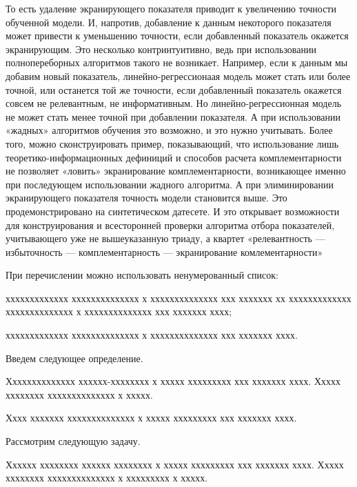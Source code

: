\documentclass[12pt]{a&t}
\begin{document}
То есть удаление экранирующего показателя приводит к увеличению точности обученной модели. И, напротив, добавление к данным некоторого показателя может привести к уменьшению точности, если добавленный показатель окажется экранирующим. Это несколько контринтуитивно, ведь при использовании полнопереборных алгоритмов такого не возникает. Например, если к данным мы добавим новый показатель, линейно-регрессионаая модель может стать или более точной, или останется той же точности, если добавленный показатель окажется совсем не релевантным, не информативным. Но линейно-регрессионная модель не может стать менее точной при добавлении показателя. А при использовании «жадных» алгоритмов обучения это возможно, и это нужно учитывать.
Более того, можно сконструировать пример, показывающий, что использование лишь теоретико-информационных дефиниций и способов расчета комплементарности не позволяет «ловить» экранирование комплементарности, возникающее именно при последующем использовании жадного алгоритма. А при элиминировании экранирующего показателя точность модели становится выше. Это продемонстрировано на синтетическом датесете. И это открывает возможности для конструирования и всесторонней проверки алгоритма отбора показателей, учитывающего уже не вышеуказанную триаду, а квартет «релевантность — избыточность — комплементарность — экранирование комлементарности»

При перечислении можно использовать ненумерованный список:
\begin{itemlist}
\item
ххххххххххххх хххххххххххххх х хххххххххххххх ххх ххххххх хх
ххххххххххххх хххххххххххххх х хххххххххххххх ххх ххххххх хххх;

\item
ххххххххххххх хххххххххххххх х хххххххххххххх ххх ххххххх хххх.
\end{itemlist}

Введем следующее определение.

\begin{definition}
Хххххххххххххх хххххх-хххххххх х ххххх ххххххххх ххх ххххххх хххх.
Ххххх хххххххх хххххххххххххх х ххххх.
\end{definition}

Хххх ххххххх хххххххххххххх х ххххх ххххххххх ххх ххххххх хххх.

Рассмотрим следующую задачу.

\begin{problem} \label{prob:1}
Хххххх хххххххх хххххх хххххххх х ххххх ххххххххх ххх ххххххх хххх.
Ххххх хххххххх хххххххххххххх х ххххххххх х ххххх.
\end{problem}
\end{document}
